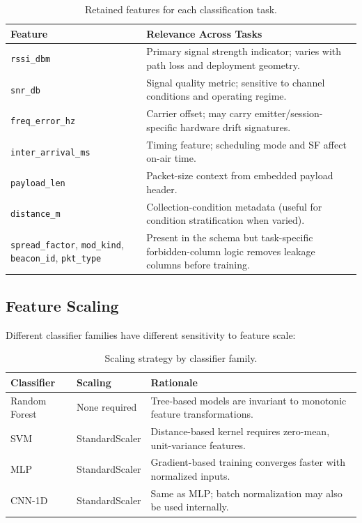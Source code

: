 \documentclass[11pt,letterpaper]{article}
\begin{document}
	\begin{table}[ht!]
		\centering
		\caption{Retained features for each classification task.}
		\label{tab:retained_features}
		\renewcommand{\arraystretch}{1.3}
		\begin{tabularx}{\textwidth}{l X}
			\toprule
			\textbf{Feature} & \textbf{Relevance Across Tasks} \\
			\midrule
			\texttt{rssi\_dbm} & Primary signal strength indicator; varies with path loss and deployment geometry. \\
			\texttt{snr\_db} & Signal quality metric; sensitive to channel conditions and operating regime. \\
			\texttt{freq\_error\_hz} & Carrier offset; may carry emitter/session-specific hardware drift signatures. \\
			\texttt{inter\_arrival\_ms} & Timing feature; scheduling mode and SF affect on-air time. \\
			\texttt{payload\_len} & Packet-size context from embedded payload header. \\
			\texttt{distance\_m} & Collection-condition metadata (useful for condition stratification when varied). \\
			\texttt{spread\_factor}, \texttt{mod\_kind}, \texttt{beacon\_id}, \texttt{pkt\_type} & Present in the schema but task-specific forbidden-column logic removes leakage columns before training. \\
			\bottomrule
		\end{tabularx}
	\end{table}

	\subsection{Feature Scaling}

	Different classifier families have different sensitivity to feature scale:

	\begin{table}[ht!]
		\centering
		\caption{Scaling strategy by classifier family.}
		\label{tab:scaling}
		\renewcommand{\arraystretch}{1.3}
		\begin{tabularx}{\textwidth}{l l X}
			\toprule
			\textbf{Classifier} & \textbf{Scaling} & \textbf{Rationale} \\
			\midrule
			Random Forest & None required & Tree-based models are invariant to monotonic feature transformations. \\
			SVM & StandardScaler & Distance-based kernel requires zero-mean, unit-variance features. \\
			MLP & StandardScaler & Gradient-based training converges faster with normalized inputs. \\
			CNN-1D & StandardScaler & Same as MLP; batch normalization may also be used internally. \\
			\bottomrule
		\end{tabularx}
	\end{table}
\end{document}
